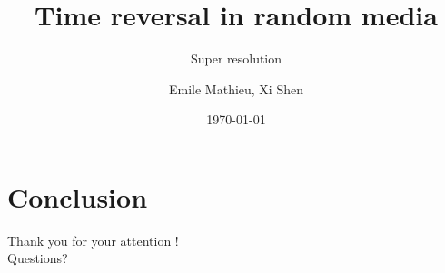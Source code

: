 \documentclass[10pt]{beamer}
\title{Time reversal in random media}
\subtitle{Super resolution}
\date{\today}
\author{Emile Mathieu, Xi Shen}
\institute{Ecole des Ponts ParisTech}
\begin{document}
\maketitle

\section{Conclusion}

\begin{frame}[standout]
 Thank you for your attention ! \\
 \vspace{3em}
  Questions?
\end{frame}

%
%  
%  
\end{document}
